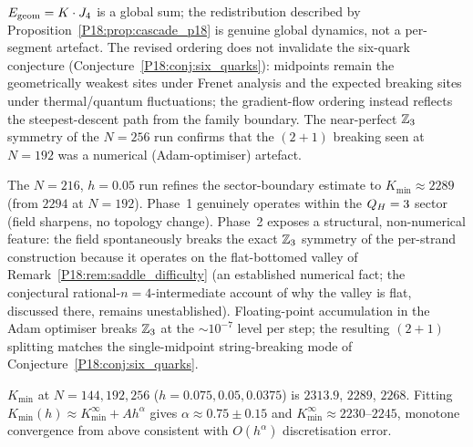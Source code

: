 \begin{remark}
\label{P18:rem:three_remark_interpretation}
$E_{\rm geom}=K\cdot J_4$ is a global sum; the redistribution
described by Proposition~\ref{P18:prop:cascade_p18} is genuine global
dynamics, not a per-segment artefact. The revised ordering does not
invalidate the six-quark conjecture (Conjecture~\ref{P18:conj:six_quarks}):
midpoints remain the geometrically weakest sites under Frenet
analysis and the expected breaking sites under thermal/quantum
fluctuations; the gradient-flow ordering instead reflects the
steepest-descent path from the family boundary. The near-perfect
$\mathbb{Z}_3$ symmetry of the $N=256$ run confirms that the $(2{+}1)$
breaking seen at $N=192$ was a numerical (Adam-optimiser) artefact.
\end{remark}

\begin{remark}
\label{P18:rem:gf_twophase_p18}
The $N=216$, $h=0.05$ run refines the sector-boundary estimate to
$K_{\min}\approx2289$ (from $2294$ at $N=192$). Phase~1 genuinely
operates within the $Q_H=3$ sector (field sharpens, no topology
change). Phase~2 exposes a structural, non-numerical feature: the
field spontaneously breaks the exact $\mathbb{Z}_3$ symmetry of the
per-strand construction because it operates on the flat-bottomed
valley of Remark~\ref{P18:rem:saddle_difficulty} (an established
numerical fact; the conjectural rational-$n=4$-intermediate account
of why the valley is flat, discussed there, remains unestablished).
Floating-point accumulation in the Adam optimiser breaks $\mathbb{Z}_3$
at the $\sim10^{-7}$ level per step; the resulting $(2{+}1)$
splitting matches the single-midpoint string-breaking mode of
Conjecture~\ref{P18:conj:six_quarks}.
\end{remark}

\begin{remark}
\label{P18:rem:kmin_extrapolation}
$K_{\min}$ at $N=144,192,256$ ($h=0.075,0.05,0.0375$) is
$2313.9$, $2289$, $2268$. Fitting
$K_{\min}(h)\approx K_{\min}^\infty+Ah^\alpha$ gives
$\alpha\approx0.75\pm0.15$ and
$K_{\min}^\infty\approx2230$--$2245$, monotone convergence from
above consistent with $O(h^\alpha)$ discretisation error.
\end{remark}

